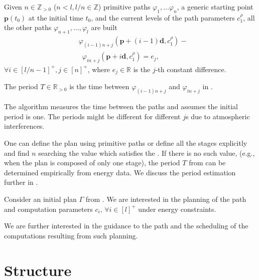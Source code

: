 Given $n\in\mathbb{Z}_{>0}$ ($n<l,l/n\in\mathbb{Z}$) primitive paths $\varphi_1,\dots\varphi_n$, a generic starting point $\mathbf{p}(t_0)$ at the initial time $t_0$, and the current levels of the path parameters $c_1^\rho$, all the other paths $\varphi_{n+1},\dots,\varphi_l$ are built
\begin{equation}\label{eq:primitive}\begin{split}
  &\varphi_{(i-1)n+j}(\mathbf{p}+(i-1)\mathbf{d},c_1^\rho)-\\ &\,\,\,\varphi_{in+j}(\mathbf{p}+i\mathbf{d},c_1^\rho)=e_j,
\end{split}\end{equation}
$\forall i\in[l/n-1]^+,j\in[n]^+$, where $e_j\in\mathbb{R}$ is the $j$-th constant difference.

\begin{highlight}
\begin{defn}[Period]\label{def:period}
  The period $T\in\mathbb{R}_{> 0}$ is the time between $\varphi_{(i-1)n+j}$ and $\varphi_{in+j}$ in .
\end{defn} 
\end{highlight}

The algorithm measures the time between the paths and assumes the initial period is one. The periods might be different for different $j$s due to atmospheric interferences.

One can define the plan using primitive paths or define all the stages explicitly and find $n$ searching the value which satisfies the . If there is no such value, (e.g., when the plan is composed of only one stage), the period $T$ from  can be determined empirically from energy data. We discuss the period estimation further in .

\begin{highlight}
\begin{pb}\label{pb}
  Consider an initial plan $\Gamma$ from . We are interested in the planning of the path and computation parameters $c_i,\,\forall i\in[l]^+$ under energy constraints.
  
We are further interested in the guidance to the path and the scheduling of the computations resulting from such planning.
\end{pb}    
\end{highlight}

\section{\color{red}Structure}
\label{sec:structure}

